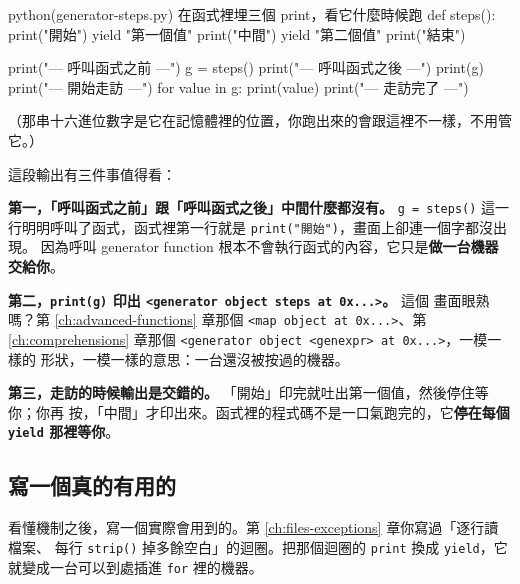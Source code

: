 \begin{example}{python}{(generator-steps.py) 在函式裡埋三個 print，看它什麼時候跑}
def steps():
    print("開始")
    yield "第一個值"
    print("中間")
    yield "第二個值"
    print("結束")


print("--- 呼叫函式之前 ---")
g = steps()
print("--- 呼叫函式之後 ---")
print(g)
print("--- 開始走訪 ---")
for value in g:
    print(value)
print("--- 走訪完了 ---")
\end{example}


（那串十六進位數字是它在記憶體裡的位置，你跑出來的會跟這裡不一樣，不用管它。）

這段輸出有三件事值得看：

\textbf{第一，「呼叫函式之前」跟「呼叫函式之後」中間什麼都沒有。} \texttt{g = steps()}
這一行明明呼叫了函式，函式裡第一行就是 \texttt{print("開始")}，畫面上卻連一個字都沒出現。
因為呼叫 generator function 根本不會執行函式的內容，它只是\textbf{做一台機器交給你}。

\textbf{第二，\texttt{print(g)} 印出 \texttt{<generator object steps at 0x...>}。} 這個
畫面眼熟嗎？第 \ref{ch:advanced-functions} 章那個 \texttt{<map object at 0x...>}、第
\ref{ch:comprehensions} 章那個 \texttt{<generator object <genexpr> at 0x...>}，一模一樣的
形狀，一模一樣的意思：一台還沒被按過的機器。

\textbf{第三，走訪的時候輸出是交錯的。} 「開始」印完就吐出第一個值，然後停住等你；你再
按，「中間」才印出來。函式裡的程式碼不是一口氣跑完的，它\textbf{停在每個 \texttt{yield}
那裡等你}。

\subsection*{寫一個真的有用的}

看懂機制之後，寫一個實際會用到的。第 \ref{ch:files-exceptions} 章你寫過「逐行讀檔案、
每行 \texttt{strip()} 掉多餘空白」的迴圈。把那個迴圈的 \texttt{print} 換成
\texttt{yield}，它就變成一台可以到處插進 \texttt{for} 裡的機器。

